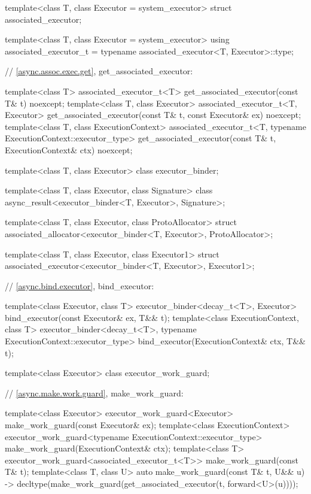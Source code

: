 \begin{codeblock}
{{{{  template<class T, class Executor = system_executor>
    struct associated_executor;

  template<class T, class Executor = system_executor>
    using associated_executor_t = typename associated_executor<T, Executor>::type;

  // \ref{async.assoc.exec.get}, get_associated_executor:

  template<class T>
    associated_executor_t<T> get_associated_executor(const T& t) noexcept;
  template<class T, class Executor>
    associated_executor_t<T, Executor>
      get_associated_executor(const T& t, const Executor& ex) noexcept;
  template<class T, class ExecutionContext>
    associated_executor_t<T, typename ExecutionContext::executor_type>
      get_associated_executor(const T& t, ExecutionContext& ctx) noexcept;

  template<class T, class Executor>
    class executor_binder;

  template<class T, class Executor, class Signature>
    class async_result<executor_binder<T, Executor>, Signature>;

  template<class T, class Executor, class ProtoAllocator>
    struct associated_allocator<executor_binder<T, Executor>, ProtoAllocator>;

  template<class T, class Executor, class Executor1>
    struct associated_executor<executor_binder<T, Executor>, Executor1>;

  // \ref{async.bind.executor}, bind_executor:

  template<class Executor, class T>
    executor_binder<decay_t<T>, Executor>
      bind_executor(const Executor& ex, T&& t);
  template<class ExecutionContext, class T>
    executor_binder<decay_t<T>, typename ExecutionContext::executor_type>
      bind_executor(ExecutionContext& ctx, T&& t);

  template<class Executor>
    class executor_work_guard;

  // \ref{async.make.work.guard}, make_work_guard:

  template<class Executor>
    executor_work_guard<Executor>
      make_work_guard(const Executor& ex);
  template<class ExecutionContext>
    executor_work_guard<typename ExecutionContext::executor_type>
      make_work_guard(ExecutionContext& ctx);
  template<class T>
    executor_work_guard<associated_executor_t<T>>
      make_work_guard(const T& t);
  template<class T, class U>
    auto make_work_guard(const T& t, U&& u)
      -> decltype(make_work_guard(get_associated_executor(t, forward<U>(u))));

}}}}
\end{codeblock}
